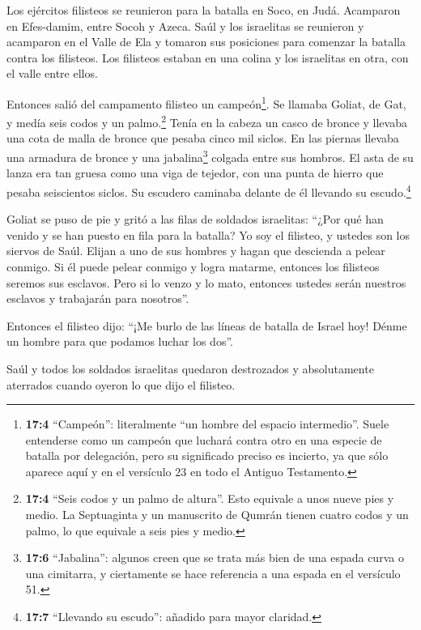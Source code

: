  Los ejércitos filisteos se reunieron para la batalla en
Soco, en Judá. Acamparon en Efes-damim, entre Socoh y Azeca.
 Saúl y los israelitas se reunieron y acamparon en el Valle
de Ela y tomaron sus posiciones para comenzar la batalla contra los
filisteos.  Los filisteos estaban en una colina y los
israelitas en otra, con el valle entre ellos.

 Entonces salió del campamento filisteo un
campeón\footnote{\textbf{17:4} ``Campeón'': literalmente ``un hombre del
  espacio intermedio''. Suele entenderse como un campeón que luchará
  contra otro en una especie de batalla por delegación, pero su
  significado preciso es incierto, ya que sólo aparece aquí y en el
  versículo 23 en todo el Antiguo Testamento.}. Se llamaba Goliat, de
Gat, y medía seis codos y un palmo.\footnote{\textbf{17:4} ``Seis codos
  y un palmo de altura''. Esto equivale a unos nueve pies y medio. La
  Septuaginta y un manuscrito de Qumrán tienen cuatro codos y un palmo,
  lo que equivale a seis pies y medio.}  Tenía en la cabeza
un casco de bronce y llevaba una cota de malla de bronce que pesaba
cinco mil siclos.  En las piernas llevaba una armadura de
bronce y una jabalina\footnote{\textbf{17:6} ``Jabalina'': algunos creen
  que se trata más bien de una espada curva o una cimitarra, y
  ciertamente se hace referencia a una espada en el versículo 51.}
colgada entre sus hombros.  El asta de su lanza era tan
gruesa como una viga de tejedor, con una punta de hierro que pesaba
seiscientos siclos. Su escudero caminaba delante de él llevando su
escudo.\footnote{\textbf{17:7} ``Llevando su escudo'': añadido para
  mayor claridad.}

 Goliat se puso de pie y gritó a las filas de soldados
israelitas: ``¿Por qué han venido y se han puesto en fila para la
batalla? Yo soy el filisteo, y ustedes son los siervos de Saúl. Elijan a
uno de sus hombres y hagan que descienda a pelear conmigo. 
Si él puede pelear conmigo y logra matarme, entonces los filisteos
seremos sus esclavos. Pero si lo venzo y lo mato, entonces ustedes serán
nuestros esclavos y trabajarán para nosotros''.

 Entonces el filisteo dijo: ``¡Me burlo de las líneas de
batalla de Israel hoy! Dénme un hombre para que podamos luchar los
dos''.

 Saúl y todos los soldados israelitas quedaron destrozados
y absolutamente aterrados cuando oyeron lo que dijo el filisteo.

